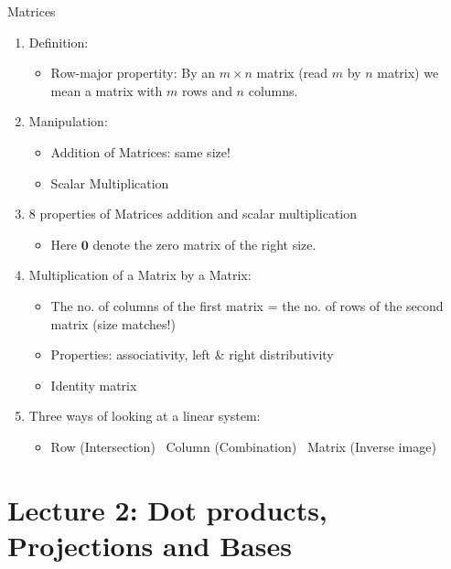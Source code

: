 \documentclass{beamer}
\begin{document}
\begin{frame}[allowframebreaks]{Matrices}
	\begin{enumerate}
		\item Definition:
		\begin{itemize}
			\item \alert{Row-major propertity}: By an $m \times n$ matrix (read $m$ by $n$ matrix) we mean a matrix with $m$ rows and $n$ columns.
		\end{itemize}
		
		\item Manipulation:
		\begin{itemize}
			\item Addition of Matrices: \alert{same size!}
			\item Scalar Multiplication
		\end{itemize}
		
		\item 8 properties of Matrices addition and scalar multiplication
		\begin{itemize}
			\item Here $\mathbf{0}$ denote the zero matrix of the \alert{right size}.
		\end{itemize}
		
		\item Multiplication of a Matrix by a Matrix:  
		\begin{itemize}
			\item The no. of columns of the first matrix = the no. of rows of the second matrix (\alert{size matches!})
			\item Properties: \alert{associativity}, \alert{left \& right distributivity}
			\item Identity matrix
		\end{itemize}
		
		\item Three ways of looking at a linear system:
		\begin{itemize}
			\item Row (Intersection)~ Column (Combination)~ Matrix (Inverse image)
		\end{itemize}
		
	\end{enumerate}
	
	
\end{frame}








\section{Lecture 2: Dot products, Projections and Bases}
\end{document}
